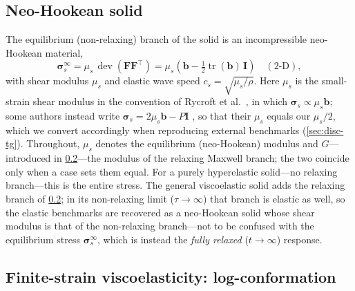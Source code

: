 \documentclass[final,3p,times]{elsarticle}
\theoremstyle{remark}
\newcommand{\Ften}{\bm{F}}              %
\newcommand{\bt}{\bm{b}}                 %
\newcommand{\It}{\bm{I}}                %
\newcommand{\sig}{\bm{\sigma}}          %
\newcommand{\tr}{\operatorname{tr}}
\newcommand{\dev}{\operatorname{dev}}
\begin{document}
\subsection{Neo-Hookean solid}
\label{sec:neohookean}
The equilibrium (non-relaxing) branch of the solid is an incompressible neo-Hookean
material,
\begin{equation}
\sig_{\!s}^{\infty} = \mu_s\,\dev\!\left(\Ften\Ften^{\!\top}\right)
   = \mu_s\!\left(\bt - \tfrac12\tr(\bt)\,\It\right)\quad(\text{2-D}),
\label{eq:neohookean}
\end{equation}
with shear modulus $\mu_s$ and elastic wave speed $c_s=\sqrt{\mu_s/\rho}$. Here $\mu_s$
is the small-strain shear modulus in the convention of Rycroft et al.\
\cite{Rycroft2020}, in which $\sig_{\!s}\!\propto\!\mu_s\bt$; some authors instead write
$\sig_{\!s}=2\mu_s\bt-P\It$ \cite{Jain2019}, so that their $\mu_s$ equals our
$\mu_s/2$, which we convert accordingly when reproducing external benchmarks
(\cref{sec:disc-tg}). Throughout, $\mu_s$ denotes the equilibrium (neo-Hookean) modulus and
$G$---introduced in \cref{sec:constitutive}---the modulus of the relaxing Maxwell branch; the
two coincide only when a case sets them equal. For a purely hyperelastic solid---no relaxing
branch---this is the entire stress. The general viscoelastic solid adds the relaxing branch of
\cref{sec:constitutive}; in its non-relaxing limit ($\tau\to\infty$) that branch is elastic
as well, so the elastic benchmarks are recovered as a neo-Hookean solid whose shear modulus is that
of the non-relaxing branch---not to be confused with the equilibrium stress $\sig_{\!s}^{\infty}$,
which is instead the \emph{fully relaxed} ($t\to\infty$) response.

\subsection{Finite-strain viscoelasticity: log-conformation}
\label{sec:constitutive}
\end{document}
